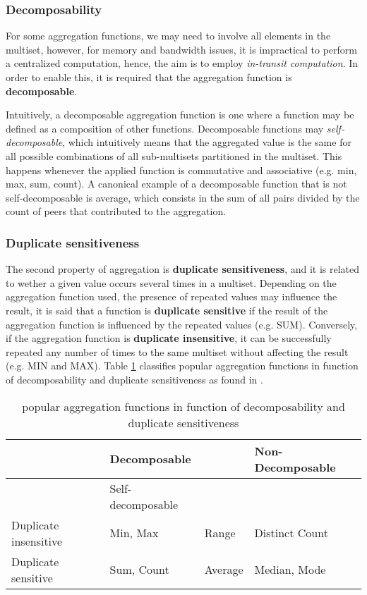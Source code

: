 \subsubsection*{Decomposability}

For some aggregation functions, we may need to involve all elements in the multiset, however, for memory and bandwidth issues, it is impractical to perform a centralized computation, hence, the aim is to employ \textit{in-transit computation}. In order to enable this, it is required that the aggregation function is \textbf{decomposable}. 

Intuitively, a decomposable aggregation function is one where a function may be defined as a composition of other functions. Decomposable functions may \textit{self-decomposable}, which intuitively means that the aggregated value is the same for all possible combinations of all sub-multisets partitioned in the multiset. This happens whenever the applied function is commutative and associative (e.g. min, max, sum, count). A canonical example of a decomposable function that is not self-decomposable is average, which consists in the sum of all pairs divided by the count of peers that contributed to the aggregation.

\subsubsection*{Duplicate sensitiveness}

The second property of aggregation is \textbf{duplicate sensitiveness}, and it is related to wether a given value occurs several times in a multiset. Depending on the aggregation function used, the presence of repeated values may influence the result, it is said that a function is \textbf{duplicate sensitive} if the result of the aggregation function is influenced by the repeated values (e.g. SUM). Conversely, if the aggregation function is \textbf{duplicate insensitive}, it can be successfully repeated any number of times to the same multiset without affecting the result (e.g. MIN and MAX). Table \ref{table:aggregation_functions} classifies popular aggregation functions in function of decomposability and duplicate sensitiveness as found in \cite{DBLP:journals/corr/abs-1110-0725}.

\begin{table}[]
    \begin{tabular}{|l|l|l|l|}
    \hline
                          & \multicolumn{2}{l|}{Decomposable} & Non-Decomposable  \\ \hline
                          & Self-decomposable    &                             &  \\ \hline
    Duplicate insensitive & Min, Max             & Range     & Distinct Count    \\ \hline
    Duplicate sensitive   & Sum, Count           & Average   & Median, Mode     \\ \hline
    \end{tabular}
    \caption{popular aggregation functions in function of decomposability and duplicate sensitiveness}
    \label{table:aggregation_functions}
\end{table}

